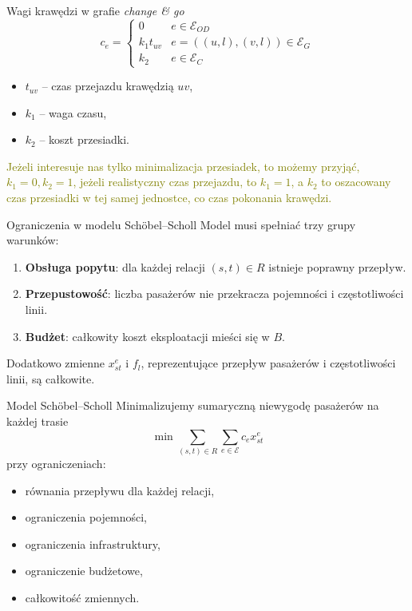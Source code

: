 \documentclass[ignorenonframetext]{beamer}
\begin{document}
\begin{frame}{Wagi krawędzi w grafie \emph{change \& go}}
  \[
    c_e =
    \begin{cases}
      0 & e \in \mathcal{E}_{OD} \\
      k_1 t_{uv} & e = ((u,l),(v,l)) \in \mathcal{E}_{G} \\
      k_2 & e \in \mathcal{E}_{C}
    \end{cases}
  \]
  \begin{itemize}
  \item \(t_{uv}\) -- czas przejazdu krawędzią \(uv\),
  \item \(k_1\) -- waga czasu,
  \item \(k_2\) -- koszt przesiadki.
  \end{itemize}
\end{frame}

\textcolor{olive} {
  Jeżeli interesuje nas tylko minimalizacja przesiadek, to możemy przyjąć, \(k_1 = 0, k_2 = 1\), jeżeli realistyczny czas przejazdu, to \(k_1 = 1\), a \(k_2\) to oszacowany czas przesiadki w tej samej jednostce, co czas pokonania krawędzi.
}

\begin{frame}{Ograniczenia w modelu Schöbel--Scholl}
  Model musi spełniać trzy grupy warunków:
  \begin{enumerate}
  \item \textbf{Obsługa popytu}: dla każdej relacji \((s,t) \in R\) istnieje poprawny przepływ.
  \item \textbf{Przepustowość}: liczba pasażerów nie przekracza pojemności i częstotliwości linii.
  \item \textbf{Budżet}: całkowity koszt eksploatacji mieści się w \(B\).
  \end{enumerate}
  Dodatkowo zmienne \(x_{st}^e\) i \(f_l\), reprezentujące przepływ pasażerów i częstotliwości linii, są całkowite.
\end{frame}

\begin{frame}{Model Schöbel--Scholl}
  Minimalizujemy sumaryczną niewygodę pasażerów na każdej trasie
  \small
  \[
    \min \sum_{(s,t) \in R} \sum_{e \in \mathcal{E}} c_e x_{st}^e
  \]
  przy ograniczeniach:
  \begin{itemize}
  \item równania przepływu dla każdej relacji,
  \item ograniczenia pojemności,
  \item ograniczenia infrastruktury,
  \item ograniczenie budżetowe,
  \item całkowitość zmiennych.
  \end{itemize}
\end{frame}
\end{document}
